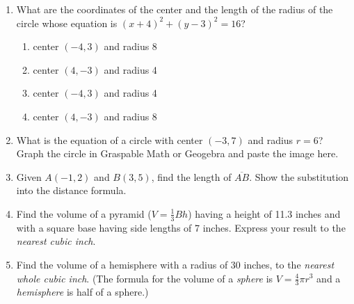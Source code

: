 \documentclass[12pt, twoside]{article}
\begin{document}
\begin{enumerate}
\newpage
\item What are the coordinates of the center and the length of the radius of the circle whose equation is $(x+4)^2+(y-3)^2=16$?
    \begin{enumerate}
      \item center $(-4,3)$ and radius 8
      \item center $(4,-3)$ and radius 4
      \item center $(-4,3)$ and radius 4
      \item center $(4,-3)$ and radius 8
    \end{enumerate}

\newpage
\item What is the equation of a circle with center $(-3,7)$ and radius $r=6$?\\[0.5cm]
  Graph the circle in Graspable Math or Geogebra and paste the image here.

\newpage
\item Given $A(-1,2)$ and $B(3,5)$, find the length of $\overline{AB}$. Show the substitution into the distance formula.
      
\newpage
\item Find the volume of a pyramid ($V=\frac{1}{3}Bh$) having a height of 11.3 inches and with a square base having side lengths of 7 inches. Express your result to the \emph{nearest cubic inch}. \vspace{5cm}

\newpage
\item Find the volume of a hemisphere with a radius of 30 inches, to the \emph{nearest whole cubic inch}. (The formula for the volume of a \emph{sphere} is $V=\frac{4}{3}\pi r^3$ and a \emph{hemisphere} is half of a sphere.) \vspace{5cm}

\end{enumerate}
\end{document}

